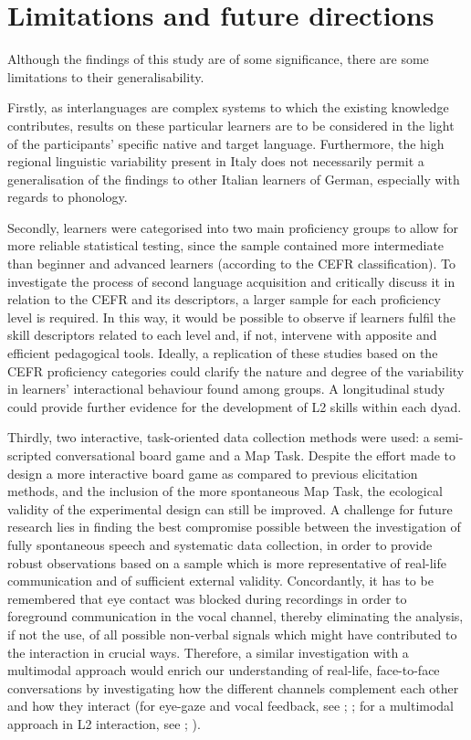 \section{Limitations and future directions}
Although the findings of this study are of some significance, there are some limitations to their generalisability.

Firstly, as interlanguages are complex systems to which the existing knowledge contributes, results on these particular learners are to be considered in the light of the participants’ specific native and target language. Furthermore, the high regional linguistic variability present in Italy does not necessarily permit a generalisation of the findings to other Italian learners of German, especially with regards to phonology. 

Secondly, learners were categorised into two main proficiency groups to allow for more reliable statistical testing, since the sample contained more intermediate than beginner and advanced learners (according to the CEFR classification). To investigate the process of second language acquisition and critically discuss it in relation to the CEFR and its descriptors, a larger sample for each proficiency level is required. In this way, it would be possible to observe if learners fulfil the skill descriptors related to each level and, if not, intervene with apposite and efficient pedagogical tools. Ideally, a replication of these studies based on the CEFR proficiency categories could clarify the nature and degree of the variability in learners’ interactional behaviour found among groups. A longitudinal study could provide further evidence for the development of L2 skills within each dyad.

Thirdly, two interactive, task-oriented data collection methods were used: a semi-scripted conversational board game and a Map Task. Despite the effort made to design a more interactive board game as compared to previous elicitation methods, and the inclusion of the more spontaneous Map Task, the ecological validity of the experimental design can still be improved. A challenge for future research lies in finding the best compromise possible between the investigation of fully spontaneous speech and systematic data collection, in order to provide robust observations based on a sample which is more representative of real-life communication and of sufficient external validity. Concordantly, it has to be remembered that eye contact was blocked during recordings in order to foreground communication in the vocal channel, thereby eliminating the analysis, if not the use, of all possible non-verbal signals which might have contributed to the interaction in crucial ways. Therefore, a similar investigation with a multimodal approach would enrich our understanding of real-life, face-to-face conversations by investigating how the different channels complement each other and how they interact (for eye-gaze and vocal feedback, see \citealt{SpaniolEtAl2023}; \citealt{SbrannaGaze2025}; for a multimodal approach in L2 interaction, see \citealt{TsunemotoEtAl2022}; \citealt{McDonoughEtAl2020}).

